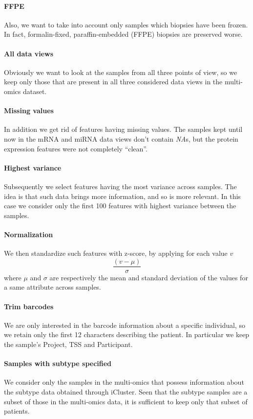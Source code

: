 \paragraph{FFPE} Also, we want to take into account only samples which biopsies have been frozen. In fact, formalin-fixed, paraffin-embedded (FFPE) biopsies are preserved worse.
\paragraph{All data views} Obviously we want to look at the samples from all three points of view, so we keep only those that are present in all three considered data views in the multi-omics dataset.
\paragraph{Missing values} In addition we get rid of features having missing values. The samples kept until now in the mRNA and miRNA data views don't contain \textit{NA}s, but the protein expression features were not completely ``clean''.\
\paragraph{Highest variance} Subsequently we select features having the most variance across samples. The idea is that such data brings more information, and so is more relevant. In this case we consider only the first 100 features with highest variance between the samples.
\paragraph{Normalization} We then standardize such features with z-score, by applying for each value $v$
\begin{equation}
    \frac{(v-\mu)}{\sigma}
\end{equation}
where $\mu$ and $\sigma$ are respectively the mean and standard deviation of the values for a same attribute across samples.
\paragraph{Trim barcodes} We are only interested in the barcode information about a specific individual, so we retain only the first 12 characters describing the patient. In particular we keep the sample's Project, TSS and Participant.
\paragraph{Samples with subtype specified} We consider only the samples in the multi-omics that possess information about the subtype data obtained through iCluster. Seen that the subtype samples are a subset of those in the multi-omics data, it is sufficient to keep only that subset of patients.

